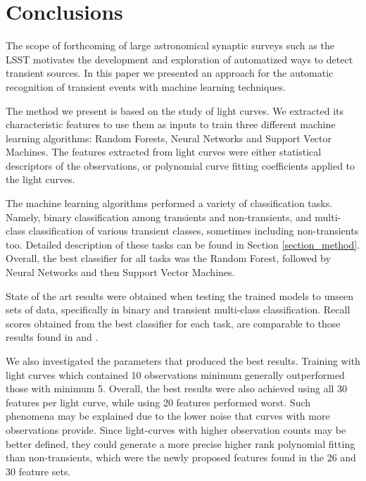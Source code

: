 \documentclass[a4paper,fleqn,usenatbib]{mnras}
\begin{document}
\section{Conclusions}

The scope of forthcoming of large astronomical synaptic surveys such
as the LSST \citep{0805.2366} motivates the development and
exploration of automatized ways to detect transient sources.
In this paper we presented an approach for the automatic recognition
of transient events with machine learning techniques.   

The method we present is based on the study of light curves. 
We extracted its characteristic features to use them as inputs
to train three different machine learning algorithms: Random Forests,
Neural Networks and Support Vector Machines.
The features extracted from light curves were either statistical
descriptors of the observations, or polynomial curve fitting
coefficients applied to the light curves.   

The machine learning algorithms performed a variety of classification tasks.
Namely, binary classification among transients and non-transients, and
multi-class classification of various transient classes, sometimes
including non-transients too. Detailed description of these tasks can
be found in Section \ref{section_method}.  
Overall, the best classifier for all tasks was the Random Forest,
followed by Neural Networks and then Support Vector Machines. 

State of the art results were obtained when testing the trained models
to unseen sets of data, specifically in binary and transient
multi-class classification. 
Recall scores obtained from the best classifier for each task, are
comparable to those results found in \cite{1401.3211}
and \cite{1601.03931}.   


We also investigated the parameters that produced the best results.
Training with light curves which contained 10 observations minimum
generally outperformed those with minimum 5. 
Overall, the best results were also achieved using all 30 features per
light curve, while using 20 features performed worst. 
Such phenomena may be explained due to the lower noise that curves
with more observations provide.  
Since light-curves with higher observation counts may be better
defined, they could generate a more precise higher rank polynomial
fitting than non-transients, which were the newly proposed features
found in the 26 and 30 feature sets. 
\end{document}

